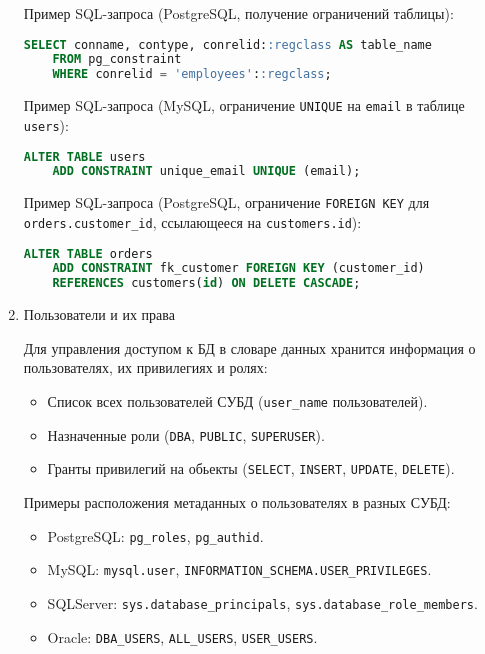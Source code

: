 \begin{enumerate}
    Пример SQL-запроса (PostgreSQL, получение ограничений таблицы):
    \begin{lstlisting}[language=SQL]
    SELECT conname, contype, conrelid::regclass AS table_name 
    FROM pg_constraint 
    WHERE conrelid = 'employees'::regclass; 
    \end{lstlisting}

    Пример SQL-запроса (MySQL, ограничение \texttt{UNIQUE} на \texttt{email} в таблице \texttt{users}):
    \begin{lstlisting}[language=SQL]
    ALTER TABLE users
    ADD CONSTRAINT unique_email UNIQUE (email);    
    \end{lstlisting}

    Пример SQL-запроса (PostgreSQL, ограничение \texttt{FOREIGN KEY} для \texttt{orders.customer\_id}, ссылающееся на \texttt{customers.id}):
    \begin{lstlisting}[language=SQL]
    ALTER TABLE orders
    ADD CONSTRAINT fk_customer FOREIGN KEY (customer_id)
    REFERENCES customers(id) ON DELETE CASCADE;
    \end{lstlisting}

    \item Пользователи и их права \autocite{MicrosoftLearnSQLserverPerm, oracledbdoc3}

    Для управления доступом к БД в словаре данных хранится информация о пользователях, их привилегиях и ролях:
    \begin{itemize}
        \item Список всех пользователей СУБД (\texttt{user\_name} пользователей).
        \item Назначенные роли (\texttt{DBA}, \texttt{PUBLIC}, \texttt{SUPERUSER}).
        \item Гранты привилегий на обьекты (\texttt{SELECT}, \texttt{INSERT}, \texttt{UPDATE}, \texttt{DELETE}).
    \end{itemize}

	Примеры расположения метаданных о пользователях в разных СУБД:

    \begin{itemize}
        \item PostgreSQL: \texttt{pg\_roles}, \texttt{pg\_authid}.
        \item MySQL: \texttt{mysql.user}, \texttt{INFORMATION\_SCHEMA.USER\_PRIVILEGES}.
        \item SQLServer: \texttt{sys.database\_principals}, \texttt{sys.database\_role\_members}.
        \item Oracle: \texttt{DBA\_USERS}, \texttt{ALL\_USERS}, \texttt{USER\_USERS}.
    \end{itemize}


\end{enumerate}
